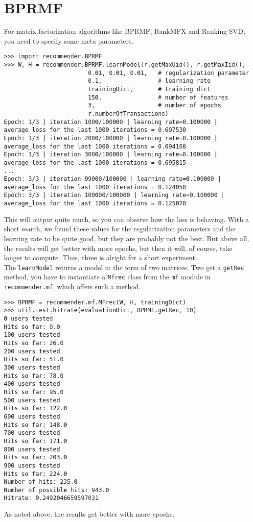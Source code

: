 \section{BPRMF}
For matrix factorization algorithms like BPRMF, RankMFX
and Ranking SVD, you need to specify some meta parameters.
\begin{lstlisting}[style=python]
>>> import recommender.BPRMF
>>> W, H = recommender.BPRMF.learnModel(r.getMaxUid(), r.getMaxIid(),
                        0.01, 0.01, 0.01,   # regularization parameter
                        0.1,                # learning rate
                        trainingDict,       # training dict
                        150,                # number of features
                        3,                  # number of epochs
                        r.numberOfTransactions)
Epoch: 1/3 | iteration 1000/100000 | learning rate=0.100000 | average_loss for the last 1000 iterations = 0.697530
Epoch: 1/3 | iteration 2000/100000 | learning rate=0.100000 | average_loss for the last 1000 iterations = 0.694108
Epoch: 1/3 | iteration 3000/100000 | learning rate=0.100000 | average_loss for the last 1000 iterations = 0.695815
...
Epoch: 3/3 | iteration 99000/100000 | learning rate=0.100000 | average_loss for the last 1000 iterations = 0.124050
Epoch: 3/3 | iteration 100000/100000 | learning rate=0.100000 | average_loss for the last 1000 iterations = 0.125070
\end{lstlisting}
This will output quite much, so you can observe how the loss is behaving.
With a short search, we found these values for the regularization parameters
and the learning rate to be quite good, but they are probably not the
best. But above all, the results will get better with more epochs, but then
it will, of course, take longer to compute. Thus, three is alright for a short
experiment.\\
The \lstinline!learnModel! returns a model in the form of two matrices. Two get a 
\lstinline!getRec! method, you have to instantiate a \lstinline!Mfrec! class from the \lstinline!mf! module
in \lstinline!recommender.mf!, which offers such a method.
\begin{lstlisting}[style=python]
>>> BPRMF = recommender.mf.MFrec(W, H, trainingDict)
>>> util.test.hitrate(evaluationDict, BPRMF.getRec, 10)
0 users tested
Hits so far: 0.0
100 users tested
Hits so far: 26.0
200 users tested
Hits so far: 51.0
300 users tested
Hits so far: 78.0
400 users tested
Hits so far: 95.0
500 users tested
Hits so far: 122.0
600 users tested
Hits so far: 148.0
700 users tested
Hits so far: 171.0
800 users tested
Hits so far: 203.0
900 users tested
Hits so far: 224.0
Number of hits: 235.0
Number of possible hits: 943.0
Hitrate: 0.2492046659597031
\end{lstlisting}
As noted above, the results get better with more epochs.
